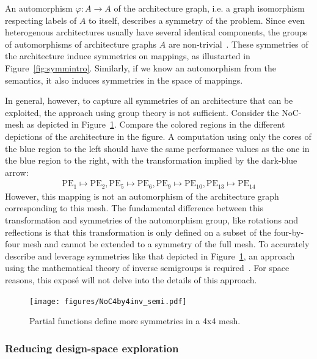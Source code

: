 \documentclass[sigplan,10pt]{acmart}
\begin{document}
An automorphism $\varphi: A \rightarrow A$ of the architecture graph, i.e. a graph isomorphism respecting labels of $A$ to itself, describes a symmetry of the problem.
Since even heterogenous architectures usually have several identical components, the groups of automorphisms of architecture graphs $A$ are non-trivial~\cite{goens_iess15}.
These symmetries of the architecture induce symmetries on mappings, as illustarted in Figure~\ref{fig:symmintro}.
Similarly, if we know an automorphism from the semantics, it also induces symmetries in the space of mappings. 

In general, however, to capture all symmetries of an architecture that can be exploited, the approach using group theory is not sufficient. 
Consider the NoC-mesh as depicted in Figure~\ref{fig:4x4NoC_inv_semi}. Compare the colored regions in the different depictions of the architecture in the figure.
A computation using only the cores of the blue region to the left should have the same performance values as the one in the blue region to the right, with the transformation implied by the dark-blue arrow:
\begin{align}
\label{eq:partial_4by4}\text{PE}_1 \mapsto \text{PE}_{2}, \text{PE}_{5} \mapsto \text{PE}_{6}, \text{PE}_9 \mapsto \text{PE}_{10}, \text{PE}_{13} \mapsto \text{PE}_{14}
\end{align}
However, this mapping is not an automorphism of the architecture graph corresponding to this mesh.
The fundamental difference between this transformation and symmetries of the automorphism group, like rotations and reflections is that this transformation is only defined on a subset of the four-by-four mesh and cannot be extended to a symmetry of the full mesh.
To accurately describe and leverage symmetries like that depicted in Figure~\ref{fig:4x4NoC_inv_semi}, an approach using the mathematical theory of inverse semigroups is required~\cite{goens_taco17}. For space reasons, this exposé will not delve into the details of this approach.


\begin{figure}[h]
	\centering
	\texttt{[image: figures/NoC4by4inv\_semi.pdf]}
	\caption{Partial functions define more symmetries in a 4x4 mesh.}
	\label{fig:4x4NoC_inv_semi}
\end{figure}



\subsubsection{Reducing design-space exploration}
\end{document}
